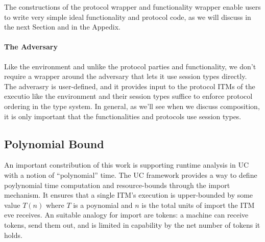 The constructions of the protocol wrapper and functionality wrapper enable users to write very simple ideal functionality and protocol code, as we will discuss in the next Section and in the Appedix.


\paragraph{The Adversary}
Like the environment and unlike the protocol parties and functionality, we don't require a wrapper around the adversary that lets it use session types directly.
The adverasry is user-defined, and it provides input to the protocol ITMs of the executio like the environment and their session types suffice to enforce protocol ordering in the type system.
In general, as we'll see when we discuss composition, it is only important that the functionalities and protocols use session types. 

\subsection{Polynomial Bound}
An important constribution of this work is supporting runtime analysis in UC with a notion of ``polynomial'' time.
The UC framework provides a way to define poylynomial time computation and resource-bounds through the import mechanism.
It ensures that a single ITM's execution is upper-bounded by some value $T(n)$ where $T$ is a poynomial and $n$ is the total units of import the ITM eve receives.
An suitable analogy for import are tokens: a machine can receive tokens, send them out, and is limited in capability by the net number of tokens it holds. 

